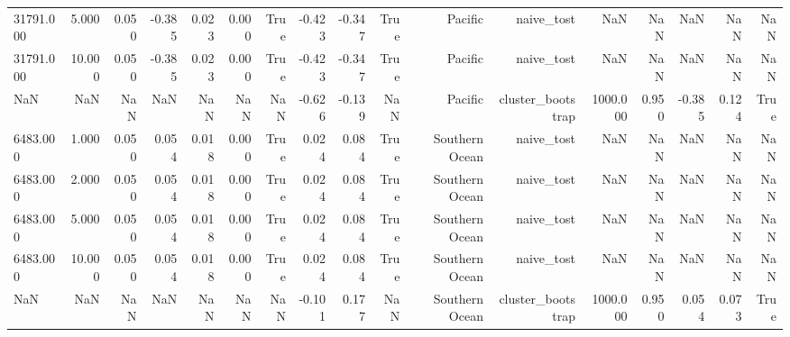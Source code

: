 \begin{table}
{\begin{tabular}{lrrrrrrrrrrrrrrrr}
31791.000 & 5.000 & 0.050 & -0.385 & 0.023 & 0.000 & True & -0.423 & -0.347 & True & Pacific & naive\_tost & NaN & NaN & NaN & NaN & NaN \\
31791.000 & 10.000 & 0.050 & -0.385 & 0.023 & 0.000 & True & -0.423 & -0.347 & True & Pacific & naive\_tost & NaN & NaN & NaN & NaN & NaN \\
NaN & NaN & NaN & NaN & NaN & NaN & NaN & -0.626 & -0.139 & NaN & Pacific & cluster\_bootstrap & 1000.000 & 0.950 & -0.385 & 0.124 & True \\
6483.000 & 1.000 & 0.050 & 0.054 & 0.018 & 0.000 & True & 0.024 & 0.084 & True & Southern Ocean & naive\_tost & NaN & NaN & NaN & NaN & NaN \\
6483.000 & 2.000 & 0.050 & 0.054 & 0.018 & 0.000 & True & 0.024 & 0.084 & True & Southern Ocean & naive\_tost & NaN & NaN & NaN & NaN & NaN \\
6483.000 & 5.000 & 0.050 & 0.054 & 0.018 & 0.000 & True & 0.024 & 0.084 & True & Southern Ocean & naive\_tost & NaN & NaN & NaN & NaN & NaN \\
6483.000 & 10.000 & 0.050 & 0.054 & 0.018 & 0.000 & True & 0.024 & 0.084 & True & Southern Ocean & naive\_tost & NaN & NaN & NaN & NaN & NaN \\
NaN & NaN & NaN & NaN & NaN & NaN & NaN & -0.101 & 0.177 & NaN & Southern Ocean & cluster\_bootstrap & 1000.000 & 0.950 & 0.054 & 0.073 & True \\
\bottomrule
\end{tabular}%
}
\end{table}

